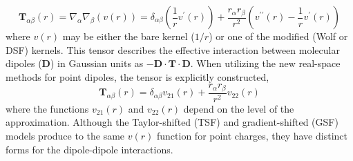 \begin{equation}
\mathbf{T}_{\alpha \beta}(r) =  \nabla_\alpha \nabla_\beta \left(v(r)\right) = \delta_{\alpha \beta}
\left(\frac{1}{r} v^\prime(r) \right) + \frac{r_{\alpha}
  r_{\beta}}{r^2} \left( v^{\prime \prime}(r) - \frac{1}{r}
  v^{\prime}(r) \right)
\label{dipole-chargeTensor}
\end{equation}
where $v(r)$ may be either the bare kernel ($1/r$) or one of the
modified (Wolf or DSF) kernels.  This tensor describes the effective
interaction between molecular dipoles ($\mathbf{D}$) in Gaussian
units as $-\mathbf{D} \cdot \mathbf{T} \cdot \mathbf{D}$.
When utilizing the new real-space methods for point dipoles, the
tensor is explicitly constructed,
\begin{equation}
\mathbf{T}_{\alpha \beta}(r)  =  \delta_{\alpha \beta} v_{21}(r) +
\frac{r_{\alpha} r_{\beta}}{r^2} v_{22}(r) 
\label{dipole-diopleTensor}
\end{equation}
where the functions $v_{21}(r)$ and $v_{22}(r)$ depend on the level of
the approximation. Although the Taylor-shifted (TSF) and
gradient-shifted (GSF) models produce to the same $v(r)$ function for
point charges, they have distinct forms for the dipole-dipole
interactions.
 
